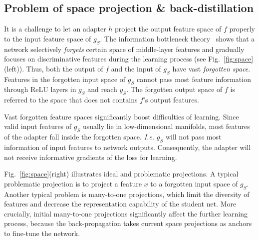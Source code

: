 \documentclass[10pt,twocolumn,letterpaper]{article}
\begin{document}
\subsection{Problem of space projection \& back-distillation}
\label{sec:challenge}

It is a challenge to let an adapter $h$ project the output feature space of $f$ properly to the input feature space of {\small$g_{S}$}. The information bottleneck theory~\cite{InformationBottleneck,InformationBottleneck2} shows that a network selectively \textit{forgets} certain space of middle-layer features and gradually focuses on discriminative features during the learning process (see Fig.~\ref{fig:space}(left)). Thus, both the output of $f$ and the input of {\small$g_{S}$} have vast \textit{forgotten space}. Features in the forgotten input space of {\small$g_{S}$} cannot pass most feature information through ReLU layers in {\small$g_{S}$} and reach {\small$y_{S}$}. The forgotten output space of $f$ is referred to the space that does not contains $f$'s output features.

Vast forgotten feature spaces significantly boost difficulties of learning. Since valid input features of {\small$g_{S}$} usually lie in low-dimensional manifolds, most features of the adapter fall inside the forgotten space. \emph{I.e.} $g_{S}$ will not pass most information of input features to network outputs. Consequently, the adapter will not receive informative gradients of the loss for learning.

Fig.~\ref{fig:space}(right) illustrates ideal and problematic projections. A typical problematic projection is to project a feature $x$ to a forgotten input space of {\small$g_{S}$}. Another typical problem is many-to-one projections, which limit the diversity of features and decrease the representation capability of the student net. More crucially, initial many-to-one projections significantly affect the further learning process, because the back-propagation takes current space projections as anchors to fine-tune the network.
\end{document}
